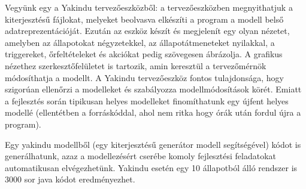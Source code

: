 \begin{pelda}
Vegyünk egy a Yakindu tervezőeszközből: a tervezőeszközben megnyithatjuk a  kiterjesztésű fájlokat, melyeket beolvasva elkészíti a program a modell belső adatreprezentációját. Ezután az eszköz készít és megjelenít egy olyan nézetet, amelyben az állapotokat négyzetekkel, az állapotátmeneteket nyilakkal, a triggereket, őrfeltételeket és akciókat pedig szövegesen ábrázolja. A grafikus nézethez szerkesztőfelületet is tartozik, amin keresztül a tervezőmérnök módosíthatja a modellt. A Yakindu tervezőeszköz fontos tulajdonsága, hogy szigorúan ellenőrzi a modelleket és szabályozza modellmódosítások körét. Emiatt a fejlesztés során tipikusan helyes modelleket finomíthatunk egy újfent helyes modellé (ellentétben a forráskóddal, ahol nem ritka hogy órák után fordul újra a program).

Egy yakindu modellből (egy  kiterjesztésű generátor modell segítségével) kódot is generálhatunk, azaz a modellezésért cserébe komoly fejlesztési feladatokat automatikusan elvégezhetünk. Yakindu esetén egy 10 állapotból álló rendszer is 3000 sor java kódot eredményezhet.
\end{pelda}

